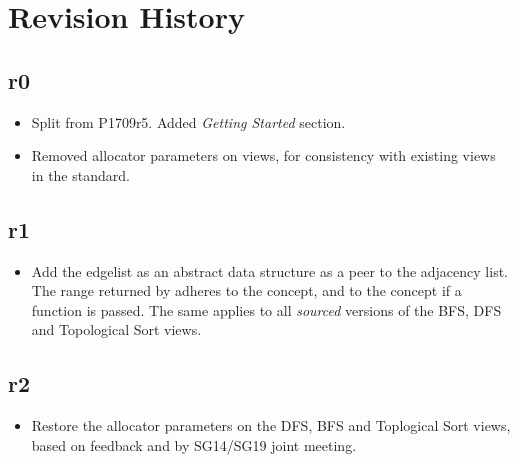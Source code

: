 \section{Revision History}

\subsection*{\paperno r0}

\begin{itemize}
      \item Split from P1709r5. Added \textit{Getting Started} section.
      \item Removed allocator parameters on views, for consistency with existing views in the standard. 
\end{itemize}

\subsection*{\paperno r1}
\begin{itemize}
      \item Add the edgelist as an abstract data structure as a peer to the adjacency list. 
            The range returned by  adheres to the  concept,
            and to the  concept if a  function is passed. The same applies to
            all \textit{sourced} versions of the BFS, DFS and Topological Sort views.
\end{itemize}

\subsection*{\paperno r2}
\begin{itemize}
      \item Restore the allocator parameters on the DFS, BFS and Toplogical Sort views, based on feedback and 
            by SG14/SG19 joint meeting.
\end{itemize}
